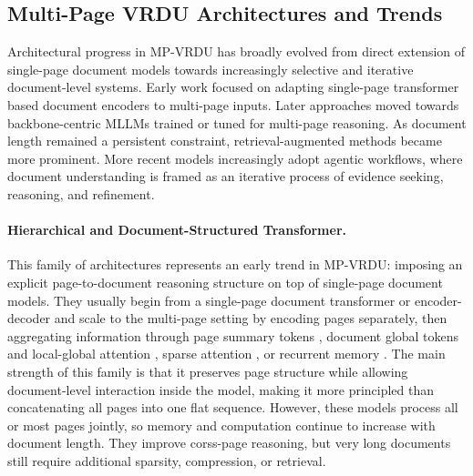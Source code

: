 \documentclass[11pt]{article}
\begin{document}
\subsection{Multi-Page VRDU Architectures and Trends}
Architectural progress in MP-VRDU has broadly evolved from direct extension of single-page document models towards increasingly selective and iterative document-level systems. Early work focused on adapting single-page transformer based document encoders to multi-page inputs. Later approaches moved towards backbone-centric MLLMs trained or tuned for multi-page reasoning. As document length remained a persistent constraint, retrieval-augmented methods became more prominent. More recent models increasingly adopt agentic workflows, where document understanding is framed as an iterative process of evidence seeking, reasoning, and refinement.

\paragraph{Hierarchical and Document-Structured Transformer.}
This family of architectures represents an early trend in MP-VRDU: imposing an explicit page-to-document reasoning structure on top of single-page document models. They usually begin from a single-page document transformer or encoder-decoder and scale to the multi-page setting by encoding pages separately, then aggregating information through page summary tokens \cite{tito2023hierarchical}, document global tokens and local-global attention \cite{blau2024gram}, sparse attention \cite{borchmann2025arctic}, or recurrent memory \cite{dong2024multi}. The main strength of this family is that it preserves page structure while allowing document-level interaction inside the model, making it more principled than concatenating all pages into one flat sequence. However, these models process all or most pages jointly, so memory and computation continue to increase with document length. They improve corss-page reasoning, but very long documents still require additional sparsity, compression, or retrieval.
\end{document}
